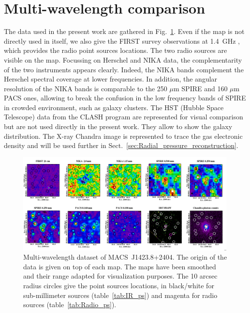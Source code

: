 \documentclass[twocolumn,traditabstract]{aa}
\begin{document}
\section{Multi-wavelength comparison}\label{sec:Multi_wavelength_comparison}
The data used in the present work are gathered in Fig.~\ref{fig:MACSJ1424_mutiw2}. Even if the map is not directly used in itself, we also give the FIRST survey observations at 1.4~GHz \citep[Faint Images of the Radio Sky at Twenty-Centimeters,][]{becker1995}, which provides the radio point sources locations. The two radio sources are visible on the map. Focussing on Herschel and NIKA data, the complementarity of the two instruments appears clearly. Indeed, the NIKA bands complement the Herschel spectral coverage at lower frequencies. In addition, the angular resolution of the NIKA bands is comparable to the 250 $\mu$m SPIRE and 160 $\mu$m PACS ones, allowing to break the confusion in the low frequency bands of SPIRE in crowded environment, such as galaxy clusters. The HST (Hubble Space Telescope) data from the CLASH program \citep[][Cluster Lensing And Supernova survey with Hubble]{postman2012} are represented for visual comparison but are not used directly in the present work. They allow to show the galaxy distribution. The X-ray Chandra image is represented to trace the gas electronic density and will be used further in Sect.~\ref{sec:Radial_pressure_reconstruction}.
\begin{figure}[h]
\centering
\includegraphics[trim=0cm 0cm 0cm 0cm, clip=true, width=0.99\textwidth]{Figure/MACSJ1424_multicolor.png}
\caption{Multi-wavelength dataset of \mbox{MACS~J1423.8+2404}. The origin of the data is given on top of each map. The maps have been smoothed and their range adapted for visualization purposes. The 10 arcsec radius circles give the point sources locations, in black/white for sub-millimeter sources (table~\ref{tab:IR_ps}) and magenta for radio sources (table~\ref{tab:Radio_ps}).}
\label{fig:MACSJ1424_mutiw2}
\end{figure}
\end{document}
